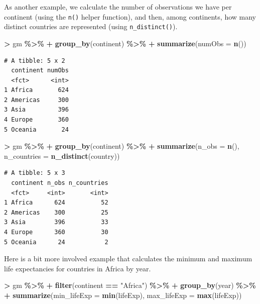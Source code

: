 \documentclass[
]{krantz}
\makeatletter
\newenvironment{Shaded}{\begin{snugshade}}{\end{snugshade}}
\newcommand{\DataTypeTok}[1]{\textcolor[rgb]{0.27,0.27,0.27}{#1}}
\newcommand{\KeywordTok}[1]{\textcolor[rgb]{0.27,0.27,0.27}{\textbf{#1}}}
\newcommand{\NormalTok}[1]{#1}
\newcommand{\OperatorTok}[1]{\textcolor[rgb]{0.43,0.43,0.43}{\textbf{#1}}}
\newcommand{\StringTok}[1]{\textcolor[rgb]{0.5,0.5,0.5}{#1}}
\newenvironment{kframe}{%
\medskip{}
\setlength{\fboxsep}{.8em}
 \def\at@end@of@kframe{}%
 \ifinner\ifhmode%
  \def\at@end@of@kframe{\end{minipage}}%
  \begin{minipage}{\columnwidth}%
 \fi\fi%
 \def\FrameCommand##1{\hskip\@totalleftmargin \hskip-\fboxsep
 \colorbox{shadecolor}{##1}\hskip-\fboxsep
     \hskip-\linewidth \hskip-\@totalleftmargin \hskip\columnwidth}%
 \MakeFramed {\advance\hsize-\width
   \@totalleftmargin\z@ \linewidth\hsize
   \@setminipage}}%
 {\par\unskip\endMakeFramed%
 \at@end@of@kframe}
\renewenvironment{Shaded}{\begin{kframe}}{\end{kframe}}
\makeatother
\begin{document}
As another example, we calculate the number of observations we have per continent (using the \texttt{n()} helper function), and then, among continents, how many distinct countries are represented (using \texttt{n\_distinct()}).

\begin{Shaded}
\begin{Highlighting}[]
\OperatorTok{\textgreater{}}\StringTok{ }\NormalTok{gm }\OperatorTok{\%\textgreater{}\%}\StringTok{ }
\OperatorTok{+}\StringTok{   }\KeywordTok{group\_by}\NormalTok{(continent) }\OperatorTok{\%\textgreater{}\%}\StringTok{ }
\OperatorTok{+}\StringTok{   }\KeywordTok{summarize}\NormalTok{(}\DataTypeTok{numObs =} \KeywordTok{n}\NormalTok{())}
\end{Highlighting}
\end{Shaded}

\begin{verbatim}
# A tibble: 5 x 2
  continent numObs
  <fct>      <int>
1 Africa       624
2 Americas     300
3 Asia         396
4 Europe       360
5 Oceania       24
\end{verbatim}

\begin{Shaded}
\begin{Highlighting}[]
\OperatorTok{\textgreater{}}\StringTok{ }\NormalTok{gm }\OperatorTok{\%\textgreater{}\%}
\OperatorTok{+}\StringTok{   }\KeywordTok{group\_by}\NormalTok{(continent) }\OperatorTok{\%\textgreater{}\%}
\OperatorTok{+}\StringTok{   }\KeywordTok{summarize}\NormalTok{(}\DataTypeTok{n\_obs =} \KeywordTok{n}\NormalTok{(), }\DataTypeTok{n\_countries =} \KeywordTok{n\_distinct}\NormalTok{(country))}
\end{Highlighting}
\end{Shaded}

\begin{verbatim}
# A tibble: 5 x 3
  continent n_obs n_countries
  <fct>     <int>       <int>
1 Africa      624          52
2 Americas    300          25
3 Asia        396          33
4 Europe      360          30
5 Oceania      24           2
\end{verbatim}

Here is a bit more involved example that calculates the minimum and maximum life expectancies for countries in Africa by year.

\begin{Shaded}
\begin{Highlighting}[]
\OperatorTok{\textgreater{}}\StringTok{ }\NormalTok{gm }\OperatorTok{\%\textgreater{}\%}
\OperatorTok{+}\StringTok{   }\KeywordTok{filter}\NormalTok{(continent }\OperatorTok{==}\StringTok{ "Africa"}\NormalTok{) }\OperatorTok{\%\textgreater{}\%}
\OperatorTok{+}\StringTok{   }\KeywordTok{group\_by}\NormalTok{(year) }\OperatorTok{\%\textgreater{}\%}
\OperatorTok{+}\StringTok{   }\KeywordTok{summarize}\NormalTok{(}\DataTypeTok{min\_lifeExp =} \KeywordTok{min}\NormalTok{(lifeExp), }\DataTypeTok{max\_lifeExp =} \KeywordTok{max}\NormalTok{(lifeExp))}
\end{Highlighting}
\end{Shaded}
\end{document}

